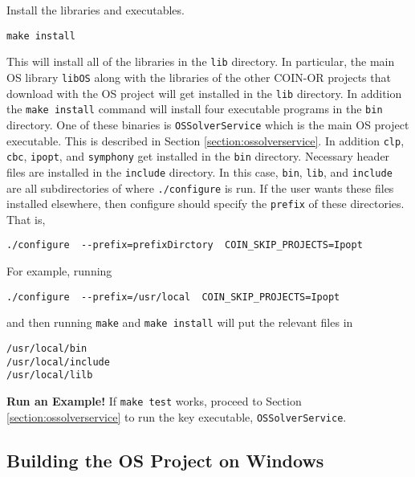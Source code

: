 \documentclass[11pt]{article}
\renewcommand{\_}{{\char"5F}}
\renewcommand{\{}{{\char"7B}}
\renewcommand{\}}{{\char"7D}}
\renewcommand{\^}{{\char"0D}}
\renewcommand{\'}{{\char"0D}}
\begin{document}
\vskip 8pt

  Install the libraries and executables. 


\begin{verbatim}
make install
\end{verbatim}

This will install all of the libraries in the  {\tt lib} directory.  In particular, the main OS library {\tt libOS} along with the libraries of the other COIN-OR projects  that download with the OS project will get installed in the {\tt lib} directory.  In addition the {\tt make install} command will install four executable programs in the {\tt bin} directory.  One of these binaries is {\tt OSSolverService} which is the main OS project executable. This is described in Section \ref{section:ossolverservice}. In addition {\tt clp}, {\tt cbc}, {\tt ipopt}, and {\tt symphony} get installed  in the {\tt bin} directory.  Necessary header files are installed in the {\tt include} directory.   In this case, {\tt bin}, {\tt lib}, and {\tt include} are all subdirectories of where {\tt ./configure} is run.   If the user wants these files installed elsewhere, then configure should specify the {\tt prefix} of these directories.  That is,


\begin{verbatim}
./configure  --prefix=prefixDirctory  COIN_SKIP_PROJECTS=Ipopt
\end{verbatim}

For example, running

\begin{verbatim}
./configure  --prefix=/usr/local  COIN_SKIP_PROJECTS=Ipopt
\end{verbatim}

\noindent and then running {\tt make} and {\tt make install} will put the relevant files in

\begin{verbatim}
/usr/local/bin
/usr/local/include
/usr/local/lilb
\end{verbatim}

\vskip 8pt

{\bf Run an Example!}  If {\tt make test} works, proceed to Section \ref{section:ossolverservice} to run the key executable, {\tt OSSolverService}.







\subsection{Building the OS Project on Windows}\label{section:windowsintall}
\end{document}
